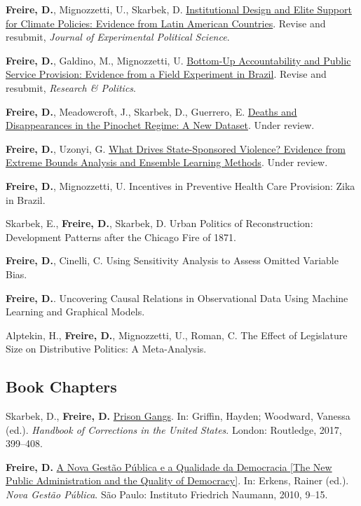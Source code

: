 \documentclass[a4paper]{article}
\renewenvironment{itemize}{
	\begin{list}{}{
			\setlength{\leftmargin}{1.5em}
		}
		}{
	\end{list}
}
\begin{document}
	\begin{itemize}
		\item \textbf{Freire, D.}, Mignozzetti, U., Skarbek, D. \href{https://doi.org/10.31235/osf.io/9a6ch}{Institutional Design and Elite Support for Climate Policies: Evidence from Latin American Countries}. Revise and resubmit, \textit{Journal of Experimental Political Science}.
		\item \textbf{Freire, D.}, Galdino, M., Mignozzetti, U. \href{https://osf.io/preprints/socarxiv/keznu}{Bottom-Up Accountability and Public Service Provision: Evidence from a Field Experiment in Brazil}. Revise and resubmit, \textit{Research \& Politics}.
		\item \textbf{Freire, D.}, Meadowcroft, J., Skarbek, D., Guerrero, E. \href{https://osf.io/vqnwu}{Deaths and Disappearances in the Pinochet Regime: A New Dataset}. Under review.
		\item \textbf{Freire, D.}, Uzonyi, G. \href{https://osf.io/pzx3q}{What Drives State-Sponsored Violence? Evidence from Extreme Bounds Analysis and Ensemble Learning Methods}. Under review.
		\item \textbf{Freire, D.}, Mignozzetti, U. Incentives in Preventive Health Care Provision: Zika in Brazil.
		\item Skarbek, E., \textbf{Freire, D.}, Skarbek, D. Urban Politics of Reconstruction: Development Patterns after the Chicago Fire of 1871.
		\item \textbf{Freire, D.}, Cinelli, C. Using Sensitivity Analysis to Assess Omitted Variable Bias.
		\item \textbf{Freire, D.}. Uncovering Causal Relations in Observational Data Using Machine Learning and Graphical Models.
		\item Alptekin, H., \textbf{Freire, D.}, Mignozzetti, U., Roman, C. The Effect of Legislature Size on Distributive Politics: A Meta-Analysis.
	\end{itemize}

	\subsection*{Book Chapters}

	\begin{itemize}
		\item Skarbek, D., \textbf{Freire, D.} \href{https://osf.io/kuqqx/}{Prison Gangs}. In: Griffin, Hayden; Woodward, Vanessa (ed.). \textit{Handbook of Corrections in the United States}. London: Routledge, 2017, 399--408.
		\item \textbf{Freire, D.} \href{https://fnst.org/sites/default/files/uploads/2017/12/08/ngp.pdf}{A Nova Gest\~{a}o P\'{u}blica e a Qualidade da Democracia {[}The New Public Administration and the Quality of Democracy{]}}. In: Erkens, Rainer (ed.). \textit{Nova Gest\~{a}o P\'{u}blica}. S\~{a}o Paulo: Instituto Friedrich Naumann, 2010, 9--15.
	\end{itemize}
\end{document}
